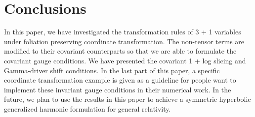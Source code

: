 \documentclass[letterpaper,nofootinbib,prd,amsmath,onecolumn]{revtex4-1}
\begin{document}
\section{Conclusions}
In this paper, we have investigated the transformation rules of 3 + 1 variables under foliation preserving coordinate transformation. The non-tensor terms are modified to their covariant counterparts so that we are able to formulate the covariant gauge conditions. We have presented the covariant 1 + log slicing and Gamma-driver shift conditions. In the last part of this paper, a specific coordinate transformation example is given as a guideline for people want to implement these invariant gauge conditions in their numerical work. In the future, we plan to use the results in this paper to achieve a symmetric hyperbolic generalized harmonic formulation for general relativity.  
\end{document}
